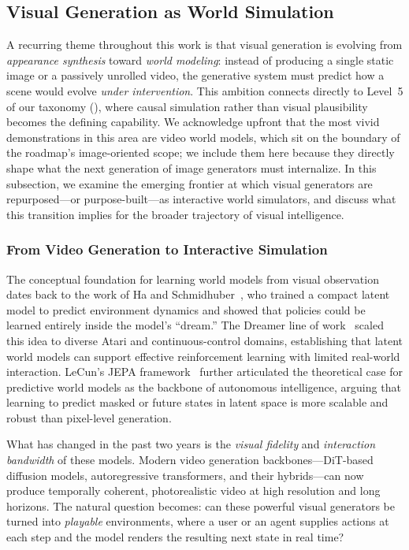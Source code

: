 \documentclass{llmxive}
\begin{document}
\subsection{Visual Generation as World Simulation}
\label{subsec:world_models}

A recurring theme throughout this work is that visual generation is evolving from \emph{appearance synthesis} toward \emph{world modeling}: instead of producing a single static image or a passively unrolled video, the generative system must predict how a scene would evolve \emph{under intervention}. This ambition connects directly to Level~5 of our taxonomy (), where causal simulation rather than visual plausibility becomes the defining capability. We acknowledge upfront that the most vivid demonstrations in this area are video world models, which sit on the boundary of the roadmap's image-oriented scope; we include them here because they directly shape what the next generation of image generators must internalize. In this subsection, we examine the emerging frontier at which visual generators are repurposed---or purpose-built---as interactive world simulators, and discuss what this transition implies for the broader trajectory of visual intelligence.

\subsubsection{From Video Generation to Interactive Simulation}

The conceptual foundation for learning world models from visual observation dates back to the work of Ha and Schmidhuber~\citep{ha2018worldmodels}, who trained a compact latent model to predict environment dynamics and showed that policies could be learned entirely inside the model's ``dream.'' The Dreamer line of work~\citep{hafner2025dreamerv3} scaled this idea to diverse Atari and continuous-control domains, establishing that latent world models can support effective reinforcement learning with limited real-world interaction. LeCun's JEPA framework~\citep{lecun2022jepa} further articulated the theoretical case for predictive world models as the backbone of autonomous intelligence, arguing that learning to predict masked or future states in latent space is more scalable and robust than pixel-level generation.

What has changed in the past two years is the \emph{visual fidelity} and \emph{interaction bandwidth} of these models. Modern video generation backbones---DiT-based diffusion models, autoregressive transformers, and their hybrids---can now produce temporally coherent, photorealistic video at high resolution and long horizons. The natural question becomes: can these powerful visual generators be turned into \emph{playable} environments, where a user or an agent supplies actions at each step and the model renders the resulting next state in real time?
\end{document}
